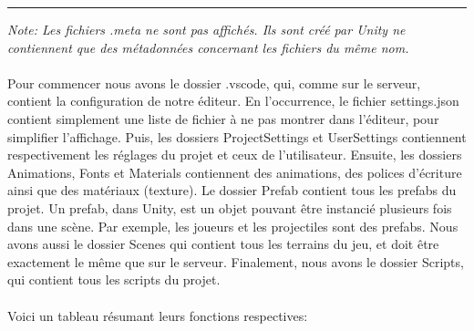 \documentclass[a4paper]{article}
\begin{document}
\hrule
\textit{Note: Les fichiers .meta ne sont pas affichés. Ils sont créé par Unity ne contiennent que des métadonnées concernant les fichiers du même nom.} \\
\\
Pour commencer nous avons le dossier {.vscode}, qui, comme sur le serveur, contient la configuration de notre éditeur. En l’occurrence, le fichier {settings.json} contient simplement une liste de fichier à ne pas montrer dans l’éditeur, pour simplifier l’affichage.
Puis, les dossiers {ProjectSettings} et {UserSettings} contiennent respectivement les réglages du projet et ceux de l’utilisateur.
Ensuite, les dossiers Animations, {Fonts} et {Materials} contiennent des animations, des polices d’écriture ainsi que des matériaux (texture). 
Le dossier {Prefab} contient tous les prefabs du projet. Un prefab, dans Unity, est un objet pouvant être instancié plusieurs fois dans une scène. Par exemple, les joueurs et les projectiles sont des prefabs.
Nous avons aussi le dossier {Scenes} qui contient tous les terrains du jeu, et doit être exactement le même que sur le serveur.
Finalement, nous avons le dossier {Scripts}, qui contient tous les scripts du projet. \\
\\
Voici un tableau résumant leurs fonctions respectives:
\end{document}
